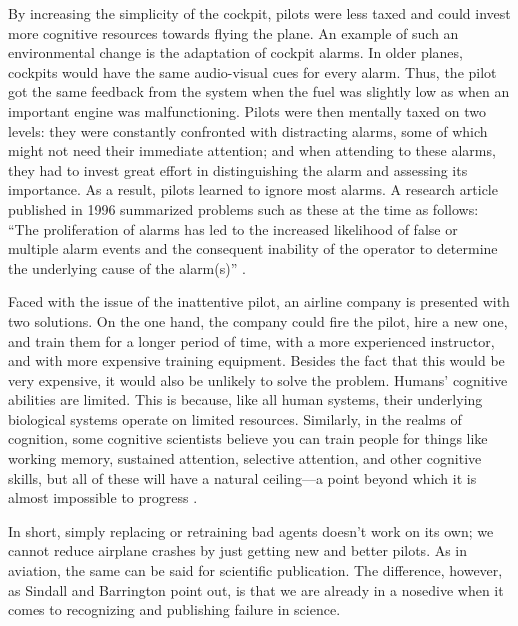 \documentclass{article}
\begin{document}
By increasing the simplicity of the cockpit, pilots were less taxed and could invest more cognitive resources towards flying the plane. An example of such an environmental change is the adaptation of cockpit alarms. In older planes, cockpits would have the same audio-visual cues for every alarm. Thus, the pilot got the same feedback from the system when the fuel was slightly low as when an important engine was malfunctioning. Pilots were then mentally taxed on two levels: they were constantly confronted with distracting alarms, some of which might not need their immediate attention; and when attending to these alarms, they had to invest great effort in distinguishing the alarm and assessing its importance. As a result, pilots learned to ignore most alarms. A research article published in 1996 summarized problems such as these at the time as follows: “The proliferation of alarms has led to the increased likelihood of false or multiple alarm events and the consequent inability of the operator to determine the underlying cause of the alarm(s)” \parencite[pp. 12][]{Gilson1996, Levin2019}. 

Faced with the issue of the inattentive pilot, an airline company is presented with two solutions. On the one hand, the company could fire the pilot, hire a new one, and train them for a longer period of time, with a more experienced instructor, and with more expensive training equipment. Besides the fact that this would be very expensive, it would also be unlikely to solve the problem. Humans' cognitive abilities are limited. This is because, like all human systems, their underlying biological systems operate on limited resources. Similarly, in the realms of cognition, some cognitive scientists believe you can train people for things like working memory, sustained attention, selective attention, and other cognitive skills, but all of these will have a natural ceiling—a point beyond which it is almost impossible to progress \parencite{Kwok2011, Traut2021}. 

In short, simply replacing or retraining bad agents doesn't work on its own; we cannot reduce airplane crashes by just getting new and better pilots. As in aviation, the same can be said for scientific publication. The difference, however, as Sindall and Barrington point out, is that we are already in a nosedive when it comes to recognizing and publishing failure in science. 

\section{}
\end{document}
